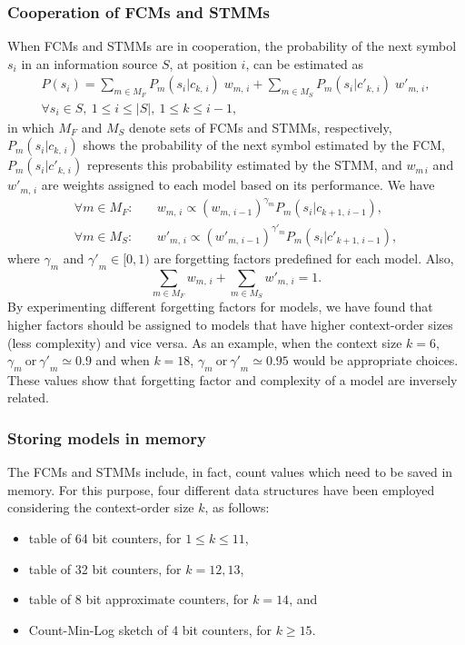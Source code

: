 \documentclass[a4paper,num-refs]{oup-contemporary}
\begin{document}
 \subsubsection*{Cooperation of FCMs and STMMs} \label{sec.coop}
 When FCMs and STMMs are in cooperation, the probability of the next symbol $s_i$ in an information source $S$, at position $i$, can be estimated as
 \begin{multline} \label{eq.coop}
   P(s_i) = \sum_{m\in M_F} P_m(s_i|c_{k,\,i})\;w_{m,\,i} + \sum_{m\in M_S} P_m(s_i|{c'}_{k,\,i})\;{w'}_{m,\,i},\\
   \forall s_i\in S,~1\le i\le |S|,~1\le k\le i-1,
 \end{multline}
 in which $M_F$ and $M_S$ denote sets of FCMs and STMMs, respectively, $P_m(s_i|c_{k,\,i})$ shows the probability of the next symbol estimated by the FCM, $P_m(s_i|{c'}_{k,\,i})$ represents this probability estimated by the STMM, and $w_{m\,i}$ and ${w'}_{m,\,i}$ are weights assigned to each model based on its performance. We have
 \begin{align}
   \forall m\in M_F: \quad & w_{m,\,i} \propto (w_{m,\,i-1})^{\gamma_m} P_m(s_i|c_{k+1,\,i-1}),
   \nonumber
   \\[1mm]
   \forall m\in M_S: \quad & {w'}_{m,\,i} \propto ({w'}_{m,\,i-1})^{{\gamma'}_m} P_m(s_i|{c'}_{k+1,\,i-1}),
 \end{align}
 where $\gamma_m$ and ${\gamma'}_m \in [0,1)$ are forgetting factors predefined for each model. Also,
 \begin{equation}
   \sum_{m\in M_F} w_{m,\,i} + \sum_{m\in M_S} {w'}_{m,\,i} = 1.
 \end{equation}
 By experimenting different forgetting factors for models, we have found that higher factors should be assigned to models that have higher context-order sizes (less complexity) and vice versa. As an example, when the context size $k=6$, $\gamma_m~\mathrm{or}~{\gamma'}_m \simeq 0.9$ and when $k=18$, $\gamma_m~\mathrm{or}~{\gamma'}_m \simeq 0.95$ would be appropriate choices. These values show that forgetting factor and complexity of a model are inversely related.

 \subsubsection*{Storing models in memory}
 The FCMs and STMMs include, in fact, count values which need to be saved in memory. For this purpose, four different data structures have been employed considering the context-order size $k$, as follows:
 \begin{itemize}
   \item table of 64 bit counters, for $1\le k\le 11$,
   \item table of 32 bit counters, for $k = 12, 13$,
   \item table of 8 bit approximate counters, for $k = 14$, and
   \item Count-Min-Log sketch of 4 bit counters, for $k \ge 15$.
 \end{itemize}
\end{document}
